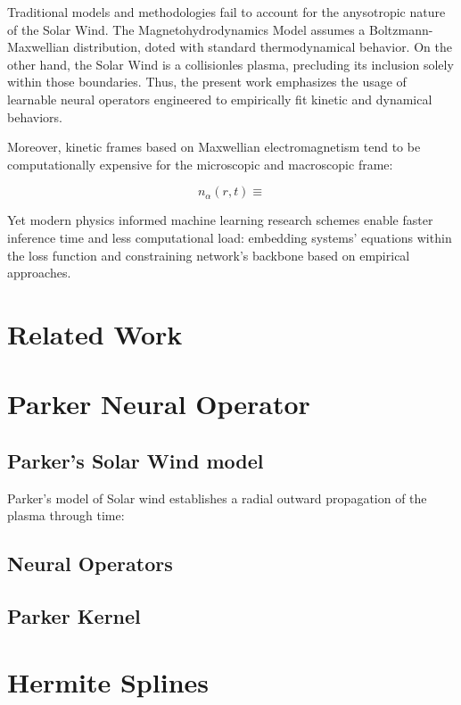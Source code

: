 \documentclass[12pt]{article}
\begin{document}
Traditional models and methodologies fail to account for the anysotropic nature of the Solar Wind. The Magnetohydrodynamics Model assumes a Boltzmann-Maxwellian distribution, doted with standard thermodynamical behavior. On the other hand, the Solar Wind is a collisionles plasma, precluding its inclusion solely within those boundaries. Thus, the present work emphasizes the usage of learnable neural operators engineered to empirically fit kinetic and dynamical behaviors.

Moreover, kinetic frames based on Maxwellian electromagnetism tend to be computationally expensive for the microscopic and macroscopic frame:

\begin{equation}
    n_{\alpha}(r, t) \equiv
\end{equation}

Yet modern physics informed machine learning research schemes enable faster inference time and less computational load: embedding systems' equations within the loss function and constraining network's backbone based on empirical approaches.

\section{Related Work}

\section{Parker Neural Operator}

\subsection{Parker's Solar Wind model}
Parker's model of Solar wind establishes a radial outward propagation of the plasma through time:

\subsection{Neural Operators}

\subsection{Parker Kernel}

\section{Hermite Splines}
\end{document}
